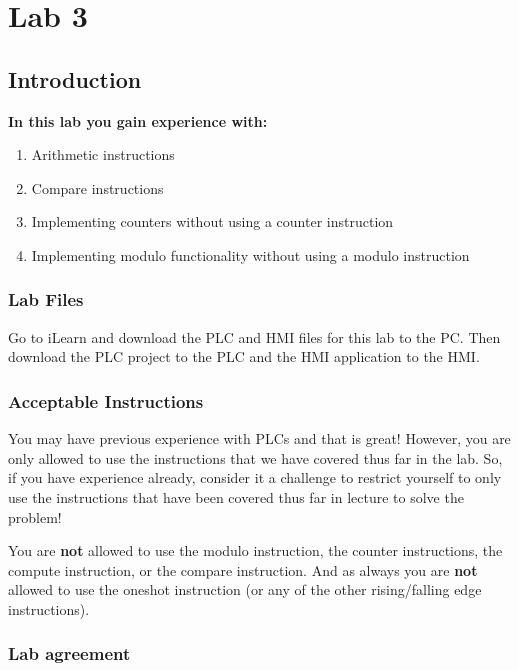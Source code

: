 \chapter{Lab 3}
\setcounter{TASignatures}{0}
\setcounter{AsideCounter}{0}

\section{Introduction}
    \vspace{0.1em}

    \textbf{In this lab you gain experience with:}
    \begin{enumerate}
        \item Arithmetic instructions
        \item Compare instructions
        \item Implementing counters without using a counter instruction
        \item Implementing modulo functionality without using a modulo instruction
    \end{enumerate}

\subsection{Lab Files}

Go to iLearn and download the PLC and HMI files for this lab to the PC. Then download the PLC project to the PLC and the HMI application to the HMI. 

\subsection{Acceptable Instructions}

You may have previous experience with PLCs and that is great! However, you are only allowed to use the instructions that we have covered thus far in the lab. So, if you have experience already, consider it a challenge to restrict yourself to only use the instructions that have been covered thus far in lecture to solve the problem!

You are \textbf{not} allowed to use the modulo instruction, the counter instructions, the compute instruction, or the compare instruction. And as always you are \textbf{not} allowed to use the oneshot instruction (or any of the other rising/falling edge instructions).

\subsection{Lab agreement}

